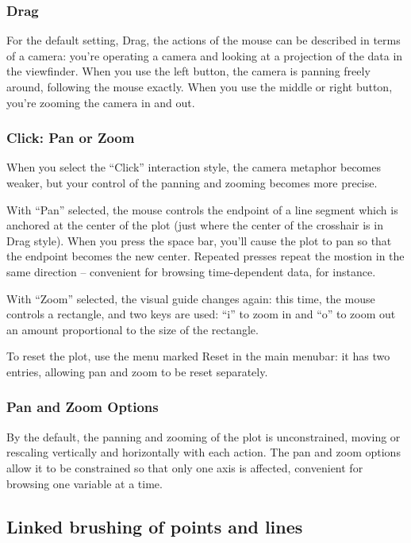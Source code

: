 \documentclass[11pt]{article}
\begin{document}
\subsubsection{Drag}

For the default setting, Drag, the actions of the mouse can be
described in terms of a camera:  you're operating a camera and
looking at a projection of the data in the viewfinder.  When you use
the left button, the camera is panning freely around, following the
mouse exactly.  When you use the middle or right button, you're
zooming the camera in and out.

\subsubsection{Click: Pan or Zoom}

When you select the ``Click'' interaction style, the camera metaphor
becomes weaker, but your control of the panning and zooming becomes
more precise.

With ``Pan'' selected, the mouse controls the endpoint of a line
segment which is anchored at the center of the plot (just where the
center of the crosshair is in Drag style).  When you press the space
bar, you'll cause the plot to pan so that the endpoint becomes the
new center.  Repeated presses repeat the mostion in the same
direction -- convenient for browsing time-dependent data, for
instance.

With ``Zoom'' selected, the visual guide changes again:  this time,
the mouse controls a rectangle, and two keys are used:  ``i'' to
zoom in and ``o'' to zoom out an amount proportional to the size
of the rectangle.

To reset the plot, use the menu marked Reset in the main menubar:
it has two entries, allowing pan and zoom to be reset separately.

\subsubsection{Pan and Zoom Options}

By the default, the panning and zooming of the plot is unconstrained,
moving or rescaling vertically and horizontally with each action.
The pan and zoom options allow it to be constrained so that only
one axis is affected, convenient for browsing one variable at a time.

\subsection{Linked brushing of points and lines}
\label{slbl:Color}
\end{document}
